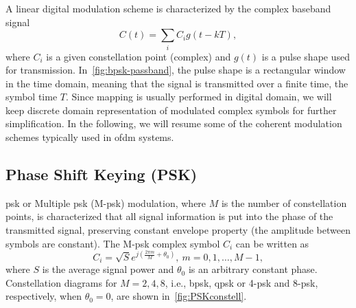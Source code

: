 A linear digital modulation scheme is characterized by the complex baseband signal~\cite{RFSDR}
%
\begin{equation}
\label{eqn:timetime}
C(t) = \sum_iC_ig(t-kT),
\end{equation}
%
where $C_i$ is a given constellation point (complex) and $g(t)$ is a pulse shape used for transmission. In~\cref{fig:bpsk-passband}, the pulse shape is a rectangular window in the time domain, meaning that the signal is transmitted over a finite time, the symbol time $T$. 
Since mapping is usually performed in digital domain, we will keep discrete domain representation of modulated complex symbols for further simplification. In the following, we will resume some of the coherent modulation schemes typically used in \gls{ofdm} systems.






\subsection{Phase Shift Keying (PSK)}
\gls{psk} or Multiple \gls{psk} (M-\gls{psk}) modulation, where $M$ is the number of constellation points, is characterized that all signal information is put into the phase of the transmitted signal, preserving constant envelope property (the amplitude between symbols are constant). The M-\gls{psk} complex symbol $C_i$ can be written as
%
\begin{equation}
\label{eqn:PSKmod}
C_i=\sqrt{S}e^{j(\frac{2\pi m}{M} + \theta_0)},\ m = 0,1,\ldots,M-1,
\end{equation}
%
where $S$ is the average signal power and $\theta_0$ is an arbitrary constant phase. Constellation diagrams for $M=2,4,8$, i.e., \gls{bpsk}, \gls{qpsk} or 4-\gls{psk} and 8-\gls{psk}, respectively, when $\theta_0=0$, are shown in~\cref{fig:PSKconstell}.


